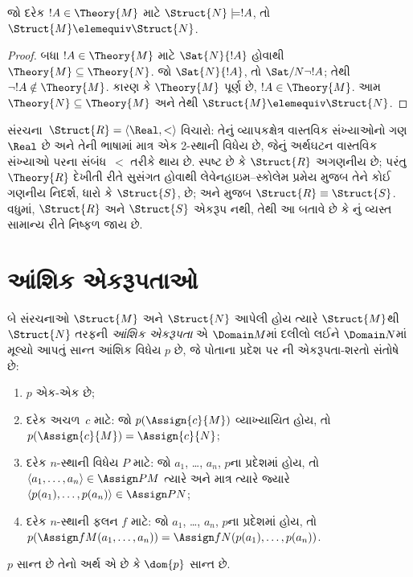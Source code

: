 \begin{prop}
  જો દરેક $!A \in \Theory{M}$ માટે $\Struct{N} \models !A$, તો
  $\Struct{M} \elemequiv \Struct{N}$.
\end{prop}

\begin{proof}
બધા $!A \in \Theory{M}$ માટે $\Sat{N}{!A}$ હોવાથી $\Theory{M}
\subseteq \Theory{N}$. જો $\Sat{N}{!A}$, તો
$\Sat/{N}{\lnot !A}$; તેથી $\lnot !A \notin \Theory{M}$. કારણ કે
$\Theory{M}$ પૂર્ણ છે, $!A \in \Theory{M}$. આમ $\Theory{N}
\subseteq \Theory{M}$ અને તેથી $\Struct{M} \elemequiv \Struct{N}$.
\end{proof}

\begin{rem}
  સંરચના~$\Struct{R} = \langle\Real, <\rangle$ વિચારો: તેનું
  વ્યાપકક્ષેત્ર વાસ્તવિક સંખ્યાઓનો ગણ $\Real$ છે અને તેની ભાષામાં માત્ર એક
  2-સ્થાની વિધેય છે, જેનું અર્થઘટન વાસ્તવિક સંખ્યાઓ પરના
  સંબંધ~$<$ તરીકે થાય છે. સ્પષ્ટ છે કે $\Struct{R}$ અગણનીય
  છે; પરંતુ $\Theory{R}$ દેખીતી રીતે સુસંગત હોવાથી લેવેનહાઇમ--સ્કોલેમ
  પ્રમેય મુજબ તેને કોઈ ગણનીય નિદર્શ, ધારો કે $\Struct{S}$,
  છે; અને  મુજબ $\Struct{R} \equiv \Struct{S}$.
  વધુમાં, $\Struct{R}$ અને $\Struct{S}$ એકરૂપ નથી, તેથી આ બતાવે છે કે
  નું વ્યસ્ત સામાન્ય રીતે નિષ્ફળ જાય છે.
\end{rem}
\endgroup


\begingroup
\makeatletter{}\makeatother

\section{આંશિક એકરૂપતાઓ}
\label{guunit:OLP-0189}


\begin{defn}
  બે સંરચનાઓ $\Struct{M}$ અને $\Struct{N}$ આપેલી હોય ત્યારે
  $\Struct{M}$થી $\Struct{N}$ તરફની \emph{આંશિક એકરૂપતા} એ
  $\Domain M$માં દલીલો લઈને $\Domain N$માં મૂલ્યો આપતું સાન્ત આંશિક
  વિધેય $p$ છે, જે પોતાના પ્રદેશ પર
  ની એકરૂપતા-શરતો સંતોષે છે:
  \begin{enumerate}
  \item $p$ એક-એક છે;
  \item દરેક અચળ~$c$ માટે: જો $p(\Assign{c}{M})$
    વ્યાખ્યાયિત હોય, તો $p(\Assign{c}{M}) = \Assign{c}{N}$;
  \item દરેક $n$-સ્થાની વિધેય $P$ માટે: જો $a_1$, \dots,
    $a_n$, $p$ના પ્રદેશમાં હોય, તો $\langle a_1, \dots, a_n\rangle
    \in \Assign P M$ ત્યારે અને માત્ર ત્યારે જ્યારે
    $\langle p(a_1), \dots, p(a_n) \rangle \in \Assign P N$;
  \item દરેક $n$-સ્થાની ફલન $f$ માટે: જો $a_1$, \dots,
    $a_n$, $p$ના પ્રદેશમાં હોય, તો $p(\Assign f M (a_1, \dots,a_n))
    = \Assign f N (p(a_1), \dots, p(a_n))$.
  \end{enumerate}
  $p$ સાન્ત છે તેનો અર્થ એ છે કે $\dom{p}$ સાન્ત છે.
\end{defn}

